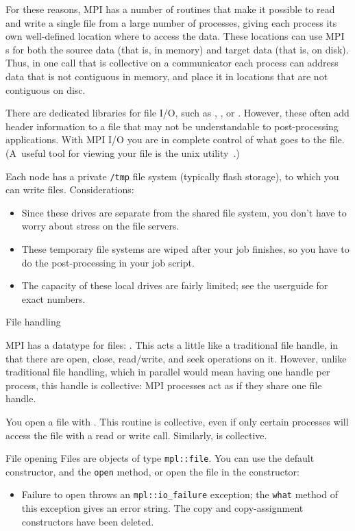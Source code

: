 For these reasons, MPI has a number of routines that make it possible
to read and write a single file from a large number of processes,
giving each process its own well-defined location where to access the data.
These locations can use MPI
s for both the source data (that is, in memory)
and target data (that is, on disk).
Thus, in one call that is collective on a communicator
each process can address data that is not contiguous in memory,
and place it in locations that are not contiguous on disc.

There are dedicated libraries for file I/O, such as ,
, or . However, these often add
header information to a file that may not be understandable to
post-processing applications. With MPI I/O you are in complete control
of what goes to the file. (A~useful tool for viewing your file is the
unix utility~.)

\begin{taccnote}
  Each node has a private \verb+/tmp+ file system
  (typically flash storage), to which
  you can write files. Considerations:
  \begin{itemize}
  \item Since these drives are separate from the shared file system,
    you don't have to worry about stress on the file servers.
  \item These temporary file systems are wiped after your job finishes,
    so you have to do the post-processing in your job script.
  \item The capacity of these local drives are fairly limited;
    see the userguide for exact numbers.
  \end{itemize}
\end{taccnote}

 {File handling}

MPI has a datatype for files: .
This acts a little like a traditional file handle,
in that there are open, close, read/write, and seek operations on it.
However, unlike traditional file handling,
which in parallel would mean having one handle per process,
this handle is collective: MPI processes
act as if they share one file handle.

You open a file with
%
.
%
This routine is collective, even if only certain processes will access
the file with a read or write call.
Similarly,  is collective.

\begin{mplnote}{File opening}
  Files are objects of type \lstinline{mpl::file}.
  You can use the default constructor, and the \lstinline{open} method,
  or open the file in the constructor:
  \begin{itemize}
  \item Failure to open throws an \lstinline{mpl::io_failure} exception;
    the \lstinline{what} method of this exception gives an error string.
    The copy and copy-assignment constructors have been deleted.
  \end{itemize}

\end{mplnote}

